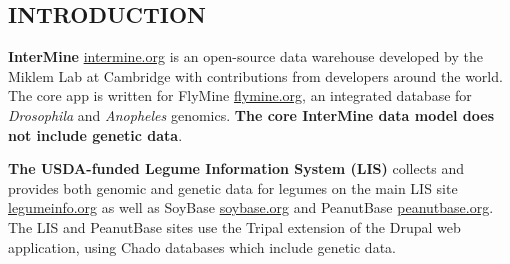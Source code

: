 \documentclass[]{pagposter}
\begin{document}
\color{NCGRBlue}\hrulefill

\color{Black}




\begin{multicols*}{3} %

  \color{Black} %




  \section*{INTRODUCTION}

  \textbf{InterMine} \url{intermine.org} is an open-source data warehouse developed by the Miklem Lab at Cambridge with contributions from developers around the world.
  The core app is written for FlyMine \url{flymine.org}, an integrated database for \textit{Drosophila} and \textit{Anopheles} genomics.
  \textbf{The core InterMine data model does not include genetic data}.

  \textbf{The USDA-funded Legume Information System (LIS)} collects and provides both genomic and genetic data for legumes on the main LIS site \url{legumeinfo.org} as well as
  SoyBase \url{soybase.org} and PeanutBase \url{peanutbase.org}. The LIS and PeanutBase sites use the Tripal extension of the Drupal web application, using Chado databases which 
  include genetic data.


\end{multicols*}
\end{document}
